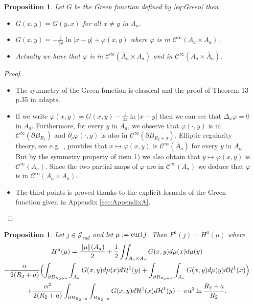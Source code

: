 \documentclass[12pt,reqno]{amsart}
\newtheorem{proposition}[theorem]{Proposition}
\def\C{{\mathcal C}}
\def\curl{{\rm curl\,}}
\def \p {\partial}
\def \J {{\mathcal J}}
\numberwithin{equation}{section}
\begin{document}
\begin{proposition}\label{prop:properties_Green_function}
Let \(G\) be the Green function defined by \eqref{eq:Green} then
\begin{itemize}
\item[1)] \(G(x,y)=G(y,x)\) for all \(x\neq y\) in \(A_a\).
\item[2)] \(G(x,y)=-\frac{1}{2\pi}\ln |x-y| +\varphi(x,y)\) where \(\varphi\) is in \(\C^\infty(A_a\times A_a)\).
\item[3)] Actually we have that \( \varphi\) is in \(\C^\infty(\overline{A}_a\times A_a)\) and in \(\C^\infty(A_a\times \overline{A}_a)\).
\end{itemize}
\end{proposition}

\begin{proof}
\begin{itemize}
\item[1)] The symmetry of the Green function is classical and the proof of Theorem 13 p.35 in \cite{Evans_2010} adapts.
\item[2)] If we write \(\varphi(x,y)=G(x,y)-\frac{1}{2\pi}\ln |x-y|\) then we can see that \(\Delta_x\varphi =0\) in \(A_a\). Furthermore, for every \(y\) in \(A_a\), we observe that \(\varphi(\cdot,y)\) is in \(\C^\infty(\p B_{R_1})\) and \(\p_{\nu} \varphi (\cdot,y)\) is also in \(\C^\infty(\p B_{R_2+a})\). Elliptic regularity theory, see e.g.\ \cite{Nardi_2014}, provides that \(x \mapsto \varphi(x,y)\) is \(\C^\infty(\overline{A}_a)\) for every \(y\) in \(A_a\). But by the symmetry property of item 1) we also obtain that \(y \mapsto \varphi(x,y)\) is \(\C^\infty(A_a)\). Since the two partial maps of \(\varphi\) are in \(\C^\infty(A_a)\) we deduce that \(\varphi\) is in \(\C^\infty(A_a\times A_a)\).
\item[3)] The third points is proved thanks to the explicit formula of the Green function given in Appendix \ref{sec:AppendixA}.
\end{itemize}
\end{proof}

\begin{proposition}\label{prop:energy_measure_green}
Let \(j\in \J_{rad}\) and let \(\mu:=\curl j\). Then \(F^a(j)=H^a(\mu)\) where
\begin{multline}\label{eq:energy_measure}
H^a(\mu)=\frac{\|\mu\|(A_a)}{2}+ \frac12 \iint_{A_a\times A_a} G(x,y) d\mu(x)d\mu(y) \\
-\frac{\alpha}{2(R_2+a)} \Bigl( \int_{\p B_{R_2+a}} \int_{A_a}G(x,y) d\mu(x) d\mathcal{H}^1(y) + \int_{\p B_{R_2+a}} \int_{A_a}G(x,y) d\mu(y) d\mathcal{H}^1(x)\Bigr) \\
+\frac{\alpha^2}{2(R_2+a)}\int_{\p B_{R_2+a}}\int_{B_{R_2+a}} G(x,y) d \mathcal{H}^1(x) d \mathcal{H}^1(y)-\pi \alpha^2\ln \frac{R_2+a}{R_2}.
\end{multline}
\end{proposition}
\end{document}
